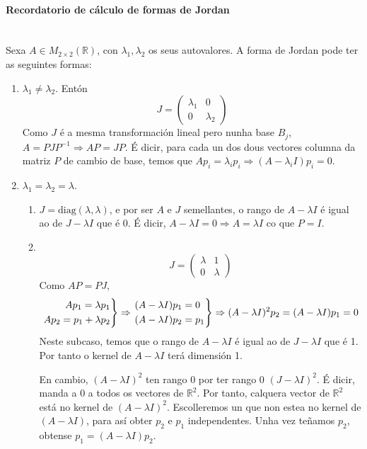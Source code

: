 \documentclass[11pt, a4paper,twoside]{article}
\theoremstyle{theorem-style}  %
\theoremstyle{definition-style}
\theoremstyle{example-style}
\newenvironment{rcases}
{\left.\begin{aligned}}
	{\end{aligned}\right\rbrace}
\begin{document}
\paragraph{Recordatorio de cálculo de formas de Jordan}\ \\
	Sexa $ A\in M_{2\times 2}(\mathbb{R}) $, con $ \lambda_1, \lambda_2 $ os seus autovalores. A forma de Jordan pode ter as seguintes formas:
	\begin{enumerate}
		\item $ \lambda_1\neq \lambda_2 $. Entón 
		\[ J=\begin{pmatrix}
		\lambda_1 &0\\
		0 &\lambda_2
		\end{pmatrix} \]
		Como $ J $ é a mesma transformación lineal pero nunha base $ B_j $, $ A=PJP^{-1} \Rightarrow AP=JP$. É dicir, para cada un dos dous vectores columna da matriz $ P $ de cambio de base, temos que $ Ap_i=\lambda_ip_i \Rightarrow (A-\lambda_iI)p_i=0$.
		\item $ \lambda_1= \lambda_2=\lambda $.
		\begin{enumerate}
			\item $ J=\text{diag}(\lambda,\lambda) $, e por ser $ A $ e $ J $ semellantes, o rango de $ A-\lambda I $ é igual ao de $ J-\lambda I $ que é 0. É dicir, $ A-\lambda I =0 \Rightarrow A=\lambda I $ co que $ P=I $.
			\item \ 
			\[ J=\begin{pmatrix}
			\lambda &1\\
			0 &\lambda
			\end{pmatrix} \]
			Como $ AP=PJ $,
			\[ \begin{rcases}
			 Ap_1 = \lambda p_1\\
			 Ap_2 = p_1 + \lambda p_2
			\end{rcases} \Rightarrow \begin{rcases}
			&(A-\lambda I) p_1=0\\
			&(A-\lambda I) p_2=p_1
			\end{rcases}\Rightarrow  (A-\lambda I)^2p_2= (A-\lambda I) p_1=0   \]
			Neste subcaso, temos que o rango de $ A-\lambda I $ é igual ao de $ J-\lambda I $ que é 1. Por tanto o kernel de $ A-\lambda I $ terá dimensión 1.
			
			En cambio, $ (A-\lambda I)^2 $ ten rango 0 por ter rango 0 $ (J-\lambda I)^2 $. É dicir, manda a 0 a todos os vectores de $ \mathbb{R}^2 $. Por tanto, calquera vector de $ \mathbb{R}^2 $ está no kernel de $ (A-\lambda I)^2 $. Escolleremos un que non estea no kernel de $ (A-\lambda I) $, para así obter $ p_2 $ e $ p_1 $ independentes. Unha vez teñamos $ p_2 $, obtense $ p_1= (A-\lambda I) p_2$.			
		\end{enumerate}
	\end{enumerate}
\end{document}
